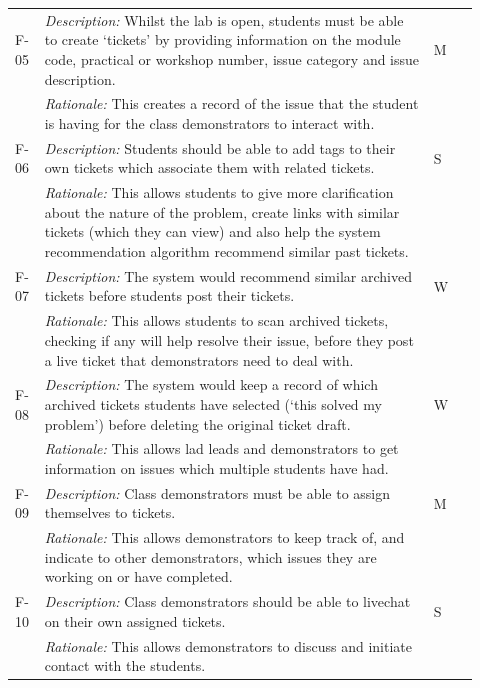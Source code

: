 \begin{table}[H]
\begin{tabular}{|p{0.05\linewidth} | p{0.78\linewidth} |p{0.09\linewidth}|}
 \hline
 F-05 & \textit{Description:} Whilst the lab is open, students must be able to create `tickets' by providing information on the module code, practical or workshop number, issue category and issue description. & M\\
  \cline{2-2}
  & \textit{Rationale:} This creates a record of the issue that the student is having for the class demonstrators to interact with. & \\

  
 \hline\hline
 F-06 & \textit{Description:} Students should be able to add tags to their own tickets which associate them with related tickets. & S\\
  \cline{2-2}
  & \textit{Rationale:} This allows students to give more clarification about the nature of the problem, create links with similar tickets (which they can view) and also help the system recommendation algorithm recommend similar past tickets. & \\

  
    \hline\hline
 F-07 & \textit{Description:} The system would recommend similar archived tickets before students post their tickets. & W\\
  \cline{2-2}
  & \textit{Rationale:} This allows students to scan archived tickets, checking if any will help resolve their issue, before they post a live ticket that demonstrators need to deal with. & \\
  
      \hline\hline
 F-08 & \textit{Description:} The system would keep a record of which archived tickets students have selected (`this solved my problem') before deleting the original ticket draft. & W\\
  \cline{2-2}
  & \textit{Rationale:} This allows lad leads and demonstrators to get information on issues which multiple students have had. & \\
  
   \hline\hline
 F-09 & \textit{Description:} Class demonstrators must be able to assign themselves to tickets. & M\\
  \cline{2-2}
  & \textit{Rationale:} This allows demonstrators to keep track of, and indicate to other demonstrators, which issues they are working on or have completed. & \\

  
  \hline\hline
 F-10 & \textit{Description:} Class demonstrators should be able to livechat on their own assigned tickets. & S\\
  \cline{2-2}
  & \textit{Rationale:} This allows demonstrators to discuss and initiate contact with the students. & \\


\end{tabular}
\end{table}
